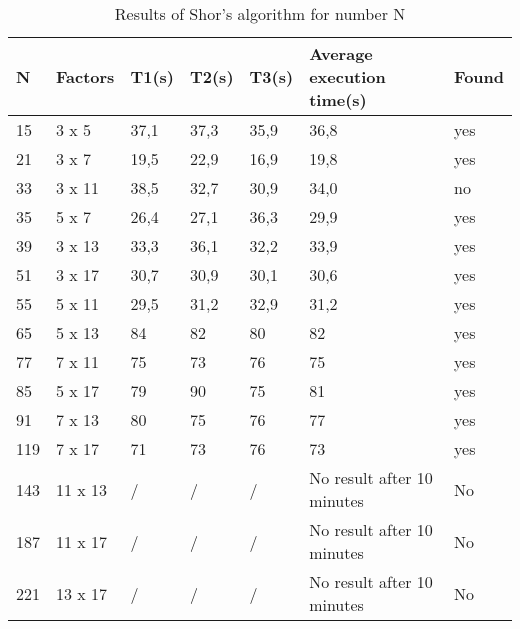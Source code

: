 \begin{table}[h]
\label{tab:quantumresults}
    \caption{Results of Shor's algorithm for number N}
    \begin{tabular}{|l|l|l|l|l|l|l|}
    \hline
    N   & Factors   & T1(s) & T2(s) & T3(s) & Average execution time(s)       & Found              \\ \hline
    15  & 3 x 5   & 37,1  & 37,3  & 35,9  & 36,8                              & yes                \\
    21  & 3 x 7   & 19,5  & 22,9  & 16,9  & 19,8                              & yes                \\
    33  & 3 x 11  & 38,5  & 32,7  & 30,9  & 34,0                              & no                 \\
    35  & 5 x 7   & 26,4  & 27,1  & 36,3  & 29,9                              & yes                \\
    39  & 3 x 13  & 33,3  & 36,1  & 32,2  & 33,9                              & yes                \\
    51  & 3 x 17  & 30,7  & 30,9  & 30,1  & 30,6                              & yes                \\
    55  & 5 x 11  & 29,5  & 31,2  & 32,9  & 31,2                              & yes                \\
    65  & 5 x 13  & 84    & 82    & 80    & 82                                & yes                \\
    77  & 7 x 11  & 75    & 73    & 76    & 75                                & yes                \\
    85  & 5 x 17  & 79    & 90    & 75    & 81                                & yes                \\
    91  & 7 x 13  & 80    & 75    & 76    & 77                                & yes                \\
    119 & 7 x 17  & 71    & 73    & 76    & 73                                & yes                \\
    143 & 11 x 13 & /     & /     & /     & No result after 10 minutes        & No                 \\
    187 & 11 x 17 & /     & /     & /     & No result after 10 minutes        & No                 \\
    221 & 13 x 17 & /     & /     & /     & No result after 10 minutes        & No                 \\ \hline
    \end{tabular}
\end{table}

